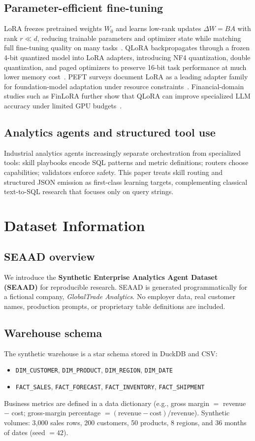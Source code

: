\documentclass[conference]{IEEEtran}
\begin{document}
\subsection{Parameter-efficient fine-tuning}
LoRA freezes pretrained weights $W_0$ and learns low-rank updates $\Delta W = BA$ with rank $r \ll d$, reducing trainable parameters and optimizer state while matching full fine-tuning quality on many tasks~\cite{hu2021lora}. QLoRA backpropagates through a frozen 4-bit quantized model into LoRA adapters, introducing NF4 quantization, double quantization, and paged optimizers to preserve 16-bit task performance at much lower memory cost~\cite{dettmers2023qlora}. PEFT surveys document LoRA as a leading adapter family for foundation-model adaptation under resource constraints~\cite{han2024peft}. Financial-domain studies such as FinLoRA further show that QLoRA can improve specialized LLM accuracy under limited GPU budgets~\cite{wang2024finlora}.
\subsection{Analytics agents and structured tool use}
Industrial analytics agents increasingly separate orchestration from specialized tools: skill playbooks encode SQL patterns and metric definitions; routers choose capabilities; validators enforce safety. This paper treats skill routing and structured JSON emission as first-class learning targets, complementing classical text-to-SQL research that focuses only on query strings.
\section{Dataset Information}
\label{sec:dataset}
\subsection{SEAAD overview}
We introduce the \textbf{Synthetic Enterprise Analytics Agent Dataset (SEAAD)} for reproducible research. SEAAD is generated programmatically for a fictional company, \textit{GlobalTrade Analytics}. No employer data, real customer names, production prompts, or proprietary table definitions are included.
\subsection{Warehouse schema}
The synthetic warehouse is a star schema stored in DuckDB and CSV:
\begin{itemize}\raggedright
\item \texttt{DIM\_CUSTOMER}, \texttt{DIM\_PRODUCT}, \texttt{DIM\_REGION}, \texttt{DIM\_DATE}
\item \texttt{FACT\_SALES}, \texttt{FACT\_FORECAST}, \texttt{FACT\_INVENTORY}, \texttt{FACT\_SHIPMENT}
\end{itemize}
Business metrics are defined in a data dictionary (e.g., gross margin $=$ revenue $-$ cost; gross-margin percentage $= (\mathrm{revenue}-\mathrm{cost})/\mathrm{revenue}$). Synthetic volumes: 3{,}000 sales rows, 200 customers, 50 products, 8 regions, and 36 months of dates (seed $=42$).
\end{document}
